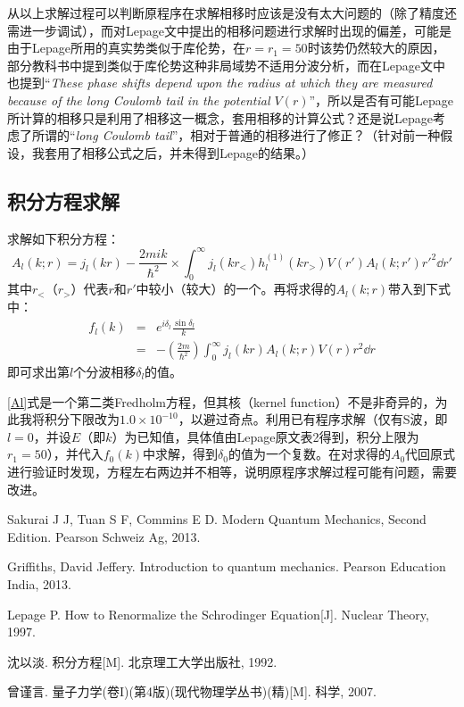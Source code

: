\documentclass{ctexart}
\begin{document}
从以上求解过程可以判断原程序在求解相移时应该是没有太大问题的（除了精度还需进一步调试），而对Lepage文中提出的相移问题进行求解时出现的偏差，可能是由于Lepage所用的真实势类似于库伦势，在$r=r_1=50$时该势仍然较大的原因，部分教科书\cite{2}中提到类似于库伦势这种非局域势不适用分波分析，而在Lepage文中也提到“\emph{These phase shifts depend
upon the radius at which they are measured because of the long Coulomb tail in
the potential $V (r)$}”，所以是否有可能Lepage所计算的相移只是利用了相移这一概念，套用相移的计算公式？还是说Lepage考虑了所谓的“\emph{long Coulomb tail}”，相对于普通的相移进行了修正？（针对前一种假设，我套用了相移公式之后，并未得到Lepage的结果。）
\subsection{积分方程求解}
求解如下积分方程：
\begin{equation}\label{Al}
  A_l(k;r)=j_l(kr)-\frac{2mik}{\hbar^2}\times\int_{0}^{\infty}j_l(kr_<)h^{(1)}_l(kr_>)V(r')A_l(k;r')r'^2\dd r'
\end{equation}
其中$r_<$（$r_>$）代表$r$和$r'$中较小（较大）的一个。再将求得的$A_l(k;r)$带入到下式中：
\begin{eqnarray}
  f_l(k) &=& e^{i\delta_l}\frac{\sin \delta_l}{k} \\
   &=& -(\frac{2m}{\hbar^2})\int_{0}^{\infty}j_l(kr)A_l(k;r)V(r)r^2\dd r
\end{eqnarray}
即可求出第$l$个分波相移$\delta_l$的值。

\eqref{Al}式是一个第二类Fredholm方程，但其核（kernel function）不是非奇异的，为此我将积分下限改为$1.0\times10^{-10}$，以避过奇点。利用已有程序求解（仅有S波，即$l=0$，并设$E$（即$k$）为已知值，具体值由Lepage原文表2得到，积分上限为$r_1=50$），并代入$f_0(k)$中求解，得到$\delta_0$的值为一个复数。在对求得的$A_0$代回原式进行验证时发现，方程左右两边并不相等，说明原程序求解过程可能有问题，需要改进。

\begin{thebibliography}{b}

Sakurai J J, Tuan S F, Commins E D. Modern Quantum Mechanics, Second Edition. Pearson Schweiz Ag, 2013.

Griffiths, David Jeffery. Introduction to quantum mechanics. Pearson Education India, 2013.

Lepage P. How to Renormalize the Schrodinger Equation[J]. Nuclear Theory, 1997.

沈以淡. 积分方程[M]. 北京理工大学出版社, 1992.

曾谨言. 量子力学(卷I)(第4版)(现代物理学丛书)(精)[M]. 科学, 2007.

\end{thebibliography}
\end{document}
